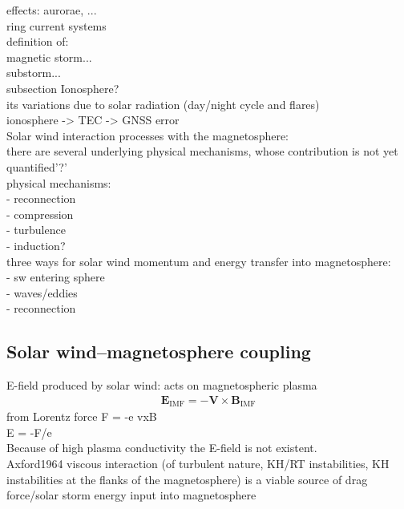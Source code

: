 effects: aurorae, ...\\

ring current systems\\

definition of:\\
magnetic storm...\\
substorm...\\

subsection Ionosphere?\\
its variations due to solar radiation (day/night cycle and flares)\\
ionosphere -> TEC -> GNSS error\\


Solar wind interaction processes with the magnetosphere:\\
there are several underlying physical mechanisms, whose contribution is not yet quantified'?'\\
physical mechanisms:\\
- reconnection\\
- compression\\
- turbulence\\
- induction?\\

three ways for solar wind momentum and energy transfer into magnetosphere:\\
- sw entering sphere\\
- waves/eddies\\
- reconnection\\


\subsection{Solar wind--magnetosphere coupling}

E-field produced by solar wind:	%
acts on magnetospheric plasma\\
\begin{align}
	\textbf{E}_\text{IMF} = -\textbf{V} \times \textbf{B}_\text{IMF}
\end{align}
from Lorentz force F = -e vxB\\
E = -F/e\\
Because of high plasma conductivity the E-field is not existent.\\

Axford1964 viscous interaction (of turbulent nature, KH/RT instabilities, KH instabilities at the flanks of the magnetosphere) is a viable source of drag force/solar storm energy input into magnetosphere\\

